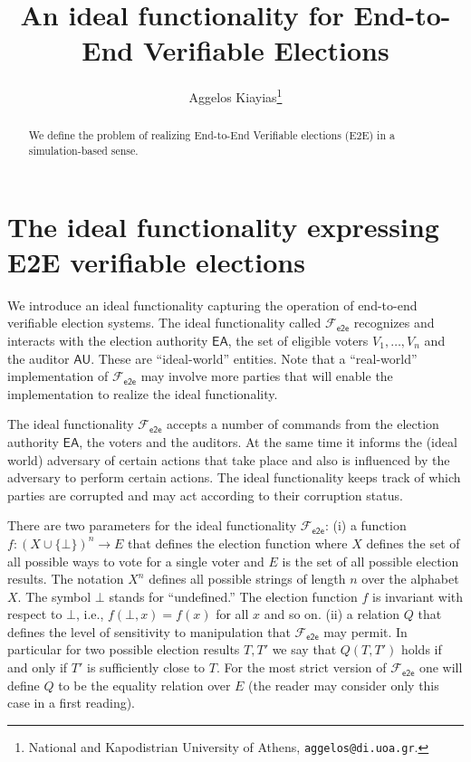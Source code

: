 \documentclass[11pt,letterpaper]{article}
\newcommand{\func}[1][\relax]{\ensuremath{\mathcal{F}_{\mathsf{#1}}}}
\newcommand{\fete}{\func[e2e]}%
\def\EA{\mathsf{EA}}
\def\AU{\mathsf{AU}}
\begin{document}
\title{An ideal functionality for End-to-End Verifiable Elections}


\author{  Aggelos Kiayias\footnote{National and Kapodistrian University of Athens, {\tt aggelos@di.uoa.gr}.}  } 



\maketitle


\begin{abstract}
We define the problem of realizing End-to-End Verifiable elections (E2E) in a simulation-based
sense. 
\end{abstract}




\section{The ideal functionality expressing E2E verifiable elections}

We introduce an ideal functionality capturing the operation of
end-to-end verifiable election systems. The ideal functionality
called $\fete$ recognizes and interacts with  the election authority
$\EA$, the set of eligible voters $V_1,\ldots, V_n$ and the auditor $\AU$.  These are ``ideal-world'' entities.
Note that a  ``real-world'' implementation of $\fete$ may involve more parties 
that will enable the implementation to realize the ideal functionality.

The ideal functionality $\fete$ accepts a number of commands from the election authority $\EA$, 
the voters and the auditors. At the same time it informs the (ideal world) 
adversary of certain actions that take place and also is influenced
by the adversary to perform certain actions. The ideal functionality keeps track
of which parties are corrupted and may act according to their corruption status. 

There are two parameters for the ideal functionality $\fete$: (i) a function $f: (X\cup \{\bot\})^n\rightarrow E$ 
that defines the election function where $X$ defines  the set of all possible ways to vote for a single voter
and $E$ is the set of all possible election results. The notation $X^n$ defines all possible strings of length $n$ 
over the alphabet $X$. The symbol $\bot$ stands for ``undefined.''
The election function $f$ is invariant with respect to $\bot$, i.e.,  $f(\bot, x)  = f(x)$ for all $x$ and so on. 
(ii) a relation $Q$ that defines the level of sensitivity to manipulation that $\fete$ may permit. In particular 
for two possible election results $T, T'$ we say that $Q(T,T')$  holds if and only if $T'$ is sufficiently
close to $T$. For the most strict  version of $\fete$ one will define   $Q$ to be the equality
relation over $E$ (the reader may consider only this case in a first reading). 
\end{document}
